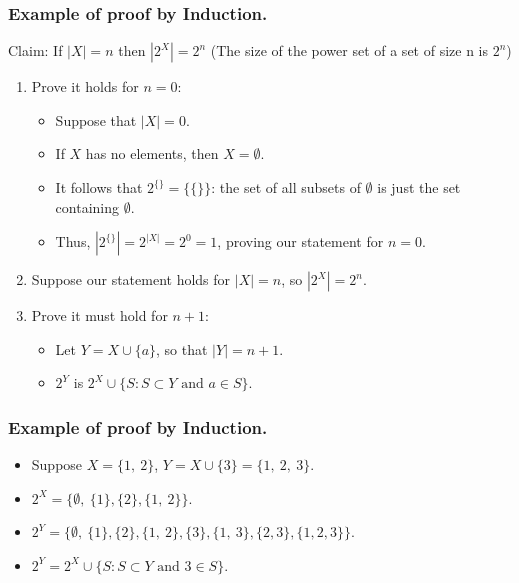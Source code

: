 \documentclass[aspectratio=169]{beamer}
\numberwithin{equation}{section}
\begin{document}
\begin{frame}
\frametitle{Example of proof by Induction.}

Claim:  If $|X|=n$ then $|2^X|=2^n$ (The size of the power set of a set of size n is $2^n$)\\\pause
\begin{enumerate}
\item Prove it holds for $n=0$: \pause
\begin{itemize}
\item Suppose that $|X|=0$.  \pause
\item If $X$ has no elements, then $X=\emptyset$. \pause
\item It follows that  $2^{\{\}}=\{\{\}\}$: the set of all subsets of $\emptyset$ is just the set containing $\emptyset$.  \pause
\item Thus, $|2^{\{\}}|=2^{|X|}=2^0=1$, proving our statement for $n=0$.
\end{itemize}
\pause
\item Suppose our statement holds for $|X|=n$, so $|2^X|=2^n$.  \pause

\item Prove it must hold for $n+1$: \pause
\begin{itemize}
\item Let $Y=X\cup \{a\}$, so that $|Y|=n+1$.  \pause
\item $2^Y$ is $2^X\cup\{S: S\subset Y \text{ and } a\in S\}$.  
\end{itemize}
\end{enumerate}
\end{frame}


\begin{frame}
\frametitle{Example of proof by Induction.}
\begin{itemize}
\item Suppose $X=\{1,\ 2\}$, $Y=X\cup \{3\}=\{1,\ 2,\ 3\}$.\pause
\item $2^X=\{\emptyset,\ \{1\}, \{2\}, \{1,\ 2\}\}$.\pause
\item $2^Y=\{\emptyset,\ \{1\}, \{2\}, \{1,\ 2\}, \{3\},\{1,\ 3\}, \{2, 3\}, \{1, 2, 3\} \}$.\pause
\item $2^Y=2^X\cup \{S: S\subset Y  \text{ and } 3\in S\}$.
 
\end{itemize}

\end{frame}
\end{document}
